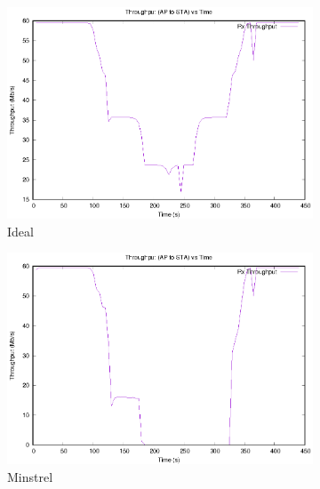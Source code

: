 \documentclass[12]{article}
\begin{document}
\begin{figure}[!htb]
\begin{subfigure}{.5\textwidth}
  \centering
  \includegraphics[width=\linewidth]{"20Mhz_Long_1SS_0AU/Ideal/DistanceThroughput"}
  \caption{Ideal}
  \label{fig:20_id_tt}
\end{subfigure}%
\begin{subfigure}{.5\textwidth}
  \includegraphics[width=\linewidth]{"20Mhz_Long_1SS_0AU/MinstrelHt/DistanceThroughput"}
  \caption{Minstrel}
  \label{fig:20_mi_tt}
\end{subfigure}%
\\
\hspace*{-1.5cm}
\begin{subfigure}{.4\textwidth}
  \centering

\end{subfigure}
\end{figure}
\end{document}
